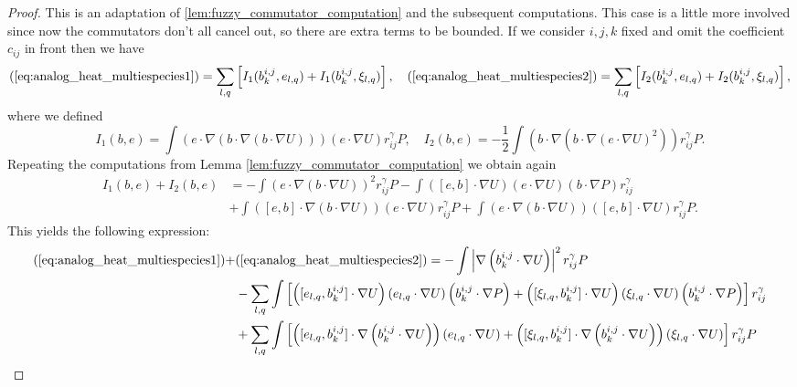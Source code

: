 \documentclass[10pt,oneside]{amsart}
\numberwithin{equation}{section}
\numberwithin{definition}{section}
\numberwithin{theorem}{section}
\numberwithin{lemma}{section}
\begin{document}
% 
\begin{proof}
  This is an adaptation of \cref{lem:fuzzy_commutator_computation} and the subsequent computations. This case is a little more involved since now the commutators don't all cancel out, so there are extra terms to be bounded. If we consider $i,j,k$ fixed and omit the coefficient $c_{ij}$ in front then we have
  \begin{equation*}
    (\ref{eq:analog_heat_multiespecies1})  
    = \sum_{l,q}\left[I_{1}(b_{k}^{i,j},e_{l,q})+I_{1}(b_{k}^{i,j},\xi_{l,q})\right], \quad 
    (\ref{eq:analog_heat_multiespecies2}) 
    = \sum_{l,q}\left[I_{2}(b_{k}^{i,j},e_{l,q})+I_{2}(b_{k}^{i,j},\xi_{l,q})\right],
  \end{equation*}
  where we defined
  \begin{equation*}
    I_{1}(b,e)=\int\left(e\cdot\nabla\left(b\cdot\nabla\left(b\cdot\nabla U\right)\right)\right)\left(e\cdot\nabla U\right)r_{ij}^{\gamma}P,
    \quad I_{2}(b,e)=-\frac{1}{2}\int\left(b\cdot\nabla\left(b\cdot\nabla\left(e\cdot\nabla U\right)^{2}\right)\right)r_{ij}^{\gamma}P.
  \end{equation*}
  Repeating the computations from Lemma \ref{lem:fuzzy_commutator_computation} we obtain again
  \begin{align*}
    I_{1}(b,e)+I_{2}(b,e) & =-\int\left(e\cdot\nabla\left(b\cdot\nabla U\right)\right)^{2}r_{ij}^{\gamma}P-\int\left([e,b]\cdot\nabla U\right)\left(e\cdot\nabla U\right)\left(b\cdot\nabla P\right)r_{ij}^{\gamma}	\\
    & +\int\left([e,b]\cdot\nabla\left(b\cdot\nabla U\right)\right)\left(e\cdot\nabla U\right)r_{ij}^{\gamma}P+\int\left(e\cdot\nabla\left(b\cdot\nabla U\right)\right)\left([e,b]\cdot\nabla U\right)r_{ij}^{\gamma}P.
  \end{align*}
  This yields the following expression:
  \begin{align}
    (\ref{eq:analog_heat_multiespecies1})  + &(\ref{eq:analog_heat_multiespecies2})  =   
    -\int\left|\nabla\left(b_{k}^{i,j}\cdot\nabla U\right)\right|^{2}r_{ij}^{\gamma}P	\nonumber\\
    & -\sum_{l,q}\int\left[\left([e_{l,q},b_{k}^{i,j}]\cdot\nabla U\right)\left(e_{l,q}\cdot\nabla U\right)\left(b_{k}^{i,j}\cdot\nabla P\right)+\left([\xi_{l,q},b_{k}^{i,j}]\cdot\nabla U\right)\left(\xi_{l,q}\cdot\nabla U\right)\left(b_{k}^{i,j}\cdot\nabla P\right)\right]r_{ij}^{\gamma} 
    \raisetag{-6mm}\label{eq:commutators1}\\
    & +\sum_{l,q}\int\left[\left([e_{l,q},b_{k}^{i,j}]\cdot\nabla\left(b_{k}^{i,j}\cdot\nabla U\right)\right)\left(e_{l,q}\cdot\nabla U\right)+\left([\xi_{l,q},b_{k}^{i,j}]\cdot\nabla\left(b_{k}^{i,j}\cdot\nabla U\right)\right)\left(\xi_{l,q}\cdot\nabla U\right)\right]r_{ij}^{\gamma}P

\end{align}
\end{proof}
\end{document}
